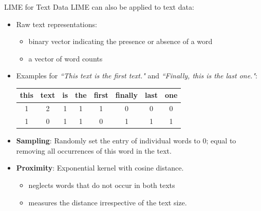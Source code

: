 \documentclass[11pt,compress,t,notes=noshow, aspectratio=169, xcolor=table]{beamer}
\begin{document}
\begin{frame}{LIME for Text Data }
    LIME can also be applied to text data: 
	\begin{itemize}
		\item Raw text representations: 
		\begin{itemize}
		    \item binary vector indicating the presence or absence of a word 
		    \item a vector of word counts
		\end{itemize}
		\item Examples for \textit{``This text is the first text."} and \textit{``Finally, this is the last one."}:
		\begin{center}
			\begin{tabular}{c|c|c|c|c|c|c|c} 
				this & text & is & the & first & finally & last & one \\ 
				\hline
				1 & 2 & 1 & 1 & 1 & 0 & 0 & 0 \\
				1 & 0 & 1 & 1 & 0 & 1 & 1 & 1 \\
			\end{tabular}
		\end{center} 
		\item \textbf{Sampling}: Randomly set the entry of individual words to $0$; equal to removing all occurrences of this word in the text. 
		\item \textbf{Proximity}: Exponential kernel with cosine distance. 
		\begin{itemize}
		    \item neglects words that do not occur in both texts 
		    \item measures the distance irrespective of the text size.
		\end{itemize}
	\end{itemize}
\end{frame}
	
\end{document}
